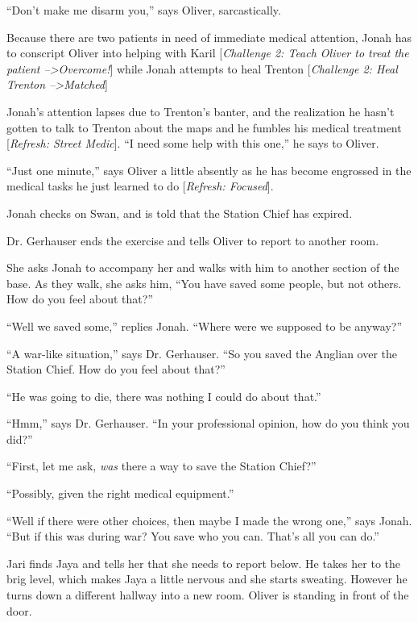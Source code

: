 ``Don't make me disarm you,'' says Oliver, sarcastically.



Because there are two patients in need of immediate medical attention, Jonah has to conscript Oliver into helping with Karil {[}\textit{Challenge 2: Teach Oliver to treat the patient --\textgreater  Overcome!}{]} while Jonah attempts to heal Trenton {[}\textit{Challenge 2: Heal Trenton --\textgreater  Matched}{]}



Jonah's attention lapses due to Trenton's banter, and the realization he hasn't gotten to talk to Trenton about the maps and he fumbles his medical treatment {[}\textit{Refresh: Street Medic}{]}. ``I need some help with this one,'' he says to Oliver.  

``Just one minute,'' says Oliver a little absently as he has become engrossed in the medical tasks he just learned to do {[}\textit{Refresh: Focused}{]}.

Jonah checks on Swan, and is told that the Station Chief has expired.



Dr. Gerhauser ends the exercise and tells Oliver to report to another room.

She asks Jonah to accompany her and walks with him to another section of the base.  As they walk, she asks him, ``You have saved some people, but not others.  How do you feel about that?''

``Well we saved some,'' replies Jonah.  ``Where were we supposed to be anyway?''

``A war-like situation,'' says Dr. Gerhauser.  ``So you saved the Anglian over the Station Chief.  How do you feel about that?''

``He was going to die, there was nothing I could do about that.''

``Hmm,'' says Dr. Gerhauser.  ``In your professional opinion, how do you think you did?''

``First, let me ask, \textit{was} there a way to save the Station Chief?''

``Possibly, given the right medical equipment.''

``Well if there were other choices, then maybe I made the wrong one,'' says Jonah.  ``But if this was during war?  You save who you can.  That's all you can do.''



Jari finds Jaya and tells her that she needs to report below.  He takes her to the brig level, which makes Jaya a little nervous and she starts sweating.  However he turns down a different hallway into a new room.  Oliver is standing in front of the door.

